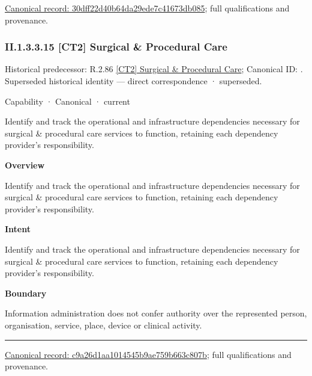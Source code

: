{\footnotesize \href{../../../../../../../continuum/strategy/capability/30dff22d40b64da29ede7c41673db085.md}{Canonical record: 30dff22d40b64da29ede7c41673db085}; full qualifications and provenance.}\par
\subsubsection*{II.1.3.3.15 [CT2] Surgical \& Procedural Care}
\label{navigation:II.1.3.3.15}

{\small Historical predecessor: R.2.86 \hyperref[element:8bc2a106165a4702b5f72fe46a206b69]{[CT2] Surgical \& Procedural Care}; Canonical ID: \texttt{}. Superseded historical identity — direct correspondence · superseded.}\par
\label{element:c9a26d1aa1014545b9ae759b663c807b}
{\small Capability · Canonical · current}\par

Identify and track the operational and infrastructure dependencies necessary for surgical \& procedural care services to function, retaining each dependency provider's responsibility.



\textbf{Overview}



Identify and track the operational and infrastructure dependencies necessary for surgical \& procedural care services to function, retaining each dependency provider's responsibility.



\textbf{Intent}



Identify and track the operational and infrastructure dependencies necessary for surgical \& procedural care services to function, retaining each dependency provider's responsibility.



\textbf{Boundary}



Information administration does not confer authority over the represented person, organisation, service, place, device or clinical activity.



\medskip\hrule\medskip

{\footnotesize \href{../../../../../../../continuum/strategy/capability/c9a26d1aa1014545b9ae759b663c807b.md}{Canonical record: c9a26d1aa1014545b9ae759b663c807b}; full qualifications and provenance.}\par
